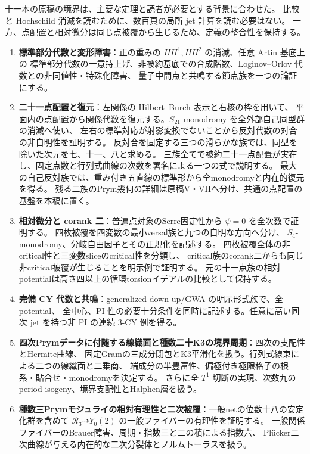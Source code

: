 十一本の原稿の境界は、主要な定理と読者が必要とする背景に合わせた。
比較と Hochschild 消滅を読むために、数百頁の局所 jet 計算を読む必要はない。
一方、点配置と相対微分は同じ点被覆から生じるため、定義の整合性を保持する。
\begin{enumerate}[label=\textbf{\Roman*.}]
\item \textbf{標準部分代数と変形障害}：正の重みの $HH^1,HH^2$ の消滅、任意 Artin 基底上の
標準部分代数の一意持上げ、非被約基底での合成階数、Loginov--Orlov 代数との非同値性・特殊化障害、
量子中間点と共鳴する節点族を一つの論証にする。
\item \textbf{二十一点配置と復元}：左関係の Hilbert--Burch 表示と右核の枠を用いて、
平面内の点配置から関係代数を復元する。$S_{21}$-monodromy を全外部自己同型群の消滅へ使い、
左右の標準対応が射影変換でないことから反対代数の対合の非自明性を証明する。
反対合を固定する三つの滑らかな族では、同型を除いた次元を七、十一、八と求める。
三族全てで被約二十一点配置が実在し、固定点数と行列式曲線の次数を署名による一つの式で説明する。
最大の自己反対族では、重み付き五直線の標準形から全monodromyと内在的復元を得る。
残る二族のPrym幾何の詳細は原稿V・VIIへ分け、共通の点配置の基盤を本稿に置く。
\item \textbf{相対微分と corank 二}：普遍点対象のSerre固定性から $\psi=0$ を全次数で証明する。
四枚被覆を四変数の最小versal族と九つの自明な方向へ分け、
$S_4$-monodromy、分岐自由因子とその正規化を記述する。
四枚被覆全体の非critical性と三変数sliceのcritical性を分類し、
critical族のcorank二からも同じ非critical被覆が生じることを明示例で証明する。
元の十一点族の相対potentialは高さ四以上の循環torsionイデアルの比較として保持する。
\item \textbf{完備 CY 代数と共鳴}：generalized down-up/GWA の明示形式族で、全 potential、
全中心、PI 性の必要十分条件を同時に記述する。任意に高い同次 jet を持つ非 PI の連続 $3$-CY 例を得る。
\item \textbf{四次Prymデータに付随する線織面と種数二十K3の境界周期}：四次の支配性とHermite曲線、
固定Gramの三成分閉包とK3平滑化を扱う。行列式線束による二つの線織面と二乗商、
端成分の半豊富性、偏極付き極限格子の根系・貼合せ・monodromyを決定する。
さらに全 $T^1$ 切断の実現、次数九のperiod isogeny、境界支配性とHalphen層を扱う。
\item \textbf{種数三Prymモジュライの相対有理性と二次被覆}：一般netの位数十八の安定化群を含めて
$\mathcal R_3\dashrightarrow Y_0(2)$ の一般ファイバーの有理性を証明する。
一般関係ファイバーのBrauer障害、周期・指数三と二の積による指数六、
Pl\"ucker二次曲線が与える内在的な二次分裂体とノルムトーラスを扱う。

\end{enumerate}
